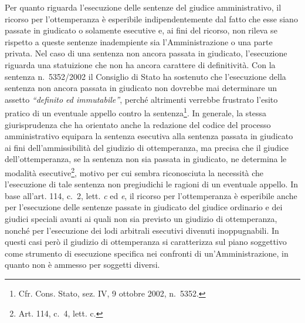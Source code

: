 \documentclass[12pt,it,a4paper,]{report}
\begin{document}
Per quanto riguarda l'esecuzione delle sentenze del giudice
amministrativo, il ricorso per l'ottemperanza è esperibile
indipendentemente dal fatto che esse siano passate in giudicato o
solamente esecutive e, ai fini del ricorso, non rileva se rispetto a
queste sentenze inadempiente sia l'Amministrazione o una parte privata.
Nel caso di una sentenza non ancora passata in giudicato, l'esecuzione
riguarda una statuizione che non ha ancora carattere di definitività.
Con la sentenza n.~5352/2002 il Consiglio di Stato ha sostenuto che
l'esecuzione della sentenza non ancora passata in giudicato non dovrebbe
mai determinare un assetto \emph{``definito ed immutabile''}, perché
altrimenti verrebbe frustrato l'esito pratico di un eventuale appello
contro la sentenza\footnote{Cfr. Cons. Stato, sez. IV, 9 ottobre 2002,
  n.~5352.}. In generale, la stessa giurisprudenza che ha orientato
anche la redazione del codice del processo amministrativo equipara la
sentenza esecutiva alla sentenza passata in giudicato ai fini
dell'ammissibilità del giudizio di ottemperanza, ma precisa che il
giudice dell'ottemperanza, se la sentenza non sia passata in giudicato,
ne determina le modalità esecutive\footnote{Art. 114, c.~4, lett. c.},
motivo per cui sembra riconosciuta la necessità che l'esecuzione di tale
sentenza non pregiudichi le ragioni di un eventuale appello. In base
all'art. 114, c.~2, lett. \emph{c} ed \emph{e}, il ricorso per
l'ottemperanza è esperibile anche per l'esecuzione delle sentenze
passate in giudicato del giudice ordinario e dei giudici speciali avanti
ai quali non sia previsto un giudizio di ottemperanza, nonché per
l'esecuzione dei lodi arbitrali esecutivi divenuti inoppugnabili. In
questi casi però il giudizio di ottemperanza si caratterizza sul piano
soggettivo come strumento di esecuzione specifica nei confronti di
un'Amministrazione, in quanto non è ammesso per soggetti diversi.
\end{document}
